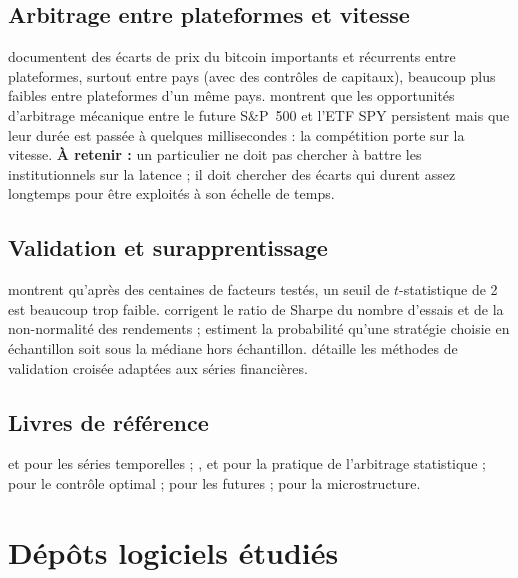 \subsection{Arbitrage entre plateformes et vitesse}

\citet{makarov2020} documentent des écarts de prix du bitcoin importants et récurrents entre plateformes, surtout entre pays (avec des contrôles de capitaux), beaucoup plus faibles entre plateformes d'un même pays. \citet{budish2015} montrent que les opportunités d'arbitrage mécanique entre le future S\&P~500 et l'ETF SPY persistent mais que leur durée est passée à quelques millisecondes : la compétition porte sur la vitesse. \textbf{À retenir :} un particulier ne doit pas chercher à battre les institutionnels sur la latence ; il doit chercher des écarts qui durent assez longtemps pour être exploités à son échelle de temps.

\subsection{Validation et surapprentissage}

\citet{harvey2016} montrent qu'après des centaines de \og facteurs\fg{} testés, un seuil de $t$-statistique de 2 est beaucoup trop faible. \citet{bailey2014dsr} corrigent le ratio de Sharpe du nombre d'essais et de la non-normalité des rendements ; \citet{bailey2017pbo} estiment la probabilité qu'une stratégie choisie en échantillon soit sous la médiane hors échantillon. \citet{lopezdeprado2018} détaille les méthodes de validation croisée adaptées aux séries financières.

\subsection{Livres de référence}

\citet{hamilton1994} et \citet{tsay2010} pour les séries temporelles ; \citet{vidyamurthy2004}, \citet{pole2007} et \citet{chan2013} pour la pratique de l'arbitrage statistique ; \citet{leungli2016} pour le contrôle optimal ; \citet{hull2022} pour les futures ; \citet{harris2003} pour la microstructure.

\section{Dépôts logiciels étudiés}

